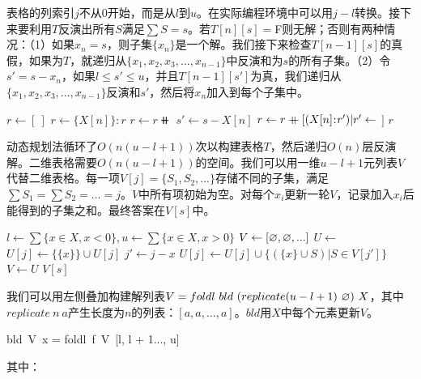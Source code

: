 \documentclass[b5paper]{ctexart}
\begin{document}
表格的列索引$j$不从0开始，而是从$l$到$u$。在实际编程环境中可以用$j - l$转换。接下来要利用$T$反演出所有$S$满足$\sum S = s$。若$T[n][s] = $F则无解；否则有两种情况：（1）如果$x_n = s$，则子集$\{x_n\}$是一个解。我们接下来检查$T[n - 1][s]$的真假，如果为$T$，就递归从$\{x_1, x_2, x_3, ..., x_{n-1}\}$中反演和为$s$的所有子集。（2）令$s' = s - x_n$，如果$l \leq s' \leq u$，并且$T[n - 1][s']$为真，我们递归从$\{x_1, x_2, x_3, ..., x_{n-1}\}$反演和$s'$，然后将$x_n$加入到每个子集中。

\begin{algorithmic}[1]
  \State $r \gets [\ ]$
    \State $r \gets \{X[n]\} : r$
  \EndIf
      \State $r \gets r \doubleplus $ 
    \EndIf
    \State $s' \gets s - X[n]$
      \State $r \gets r \mathbin{+\mkern-10mu+} [(X[n] \mathbin{\!:\!} r') | r' \gets $  $]$
    \EndIf
  \EndIf
  \State \Return $r$
\EndFunction
\end{algorithmic}

动态规划法循环了$O(n(u - l + 1))$次以构建表格$T$，然后递归$O(n)$层反演解。二维表格需要$O(n(u - l + 1))$的空间。我们可以用一维$u - l + 1$元列表$V$代替二维表格。每一项$V[j] = \{S_1, S_2, ...\}$存储不同的子集，满足$\sum S_1 = \sum S_2 = ... = j$。$V$中所有项初始为空。对每个$x_i$更新一轮$V$，记录加入$x_i$后能得到的子集之和。最终答案在$V[s]$中。

\begin{algorithmic}[1]
  \State $l \gets \sum \{x \in X, x < 0\}, u \gets \sum \{x \in X, x > 0\}$
  \State $V \gets [\varnothing, \varnothing, ...]$   
    \State $U \gets$ 
        \State $U[j] \gets \{\{x\}\} \cup U[j]$
      \EndIf
      \State $j' \gets j - x$
        \State $U[j] \gets U[j] \cup \{(\{x\} \cup S) | S \in V[j']\}$
      \EndIf
    \EndFor
    \State $V \gets U$
  \EndFor
  \State \Return $V[s]$
\EndFunction
\end{algorithmic}

我们可以用左侧叠加构建解列表$V = foldl\ bld\ (replicate (u - l + 1)\ \nil)\ X$，其中$\textit{replicate}\ n\ a$产生长度为$n$的列表：$[a, a, ..., a]$。$bld$用$X$中每个元素更新$V$。

\be
bld\ V\ x = foldl\ f\ V\ [l, l + 1..., u]
\ee

其中：
\end{document}
